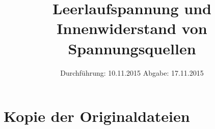 

\subject{V301}
\title{Leerlaufspannung und Innenwiderstand von Spannungsquellen}
\date{
  Durchführung: 10.11.2015
  \hspace{3em}
  Abgabe: 17.11.2015
}



\maketitle
\thispagestyle{empty}
\tableofcontents
\newpage






\printbibliography

\newpage

\appendix

\section{Kopie der Originaldateien}


